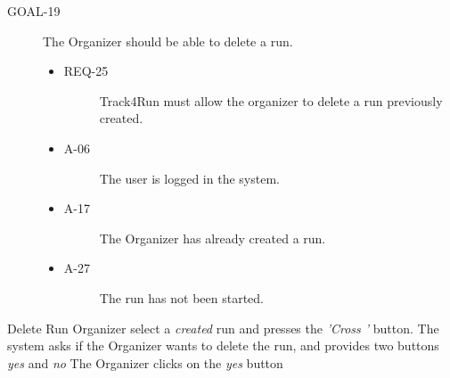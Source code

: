 \documentclass[a4paper]{article}
\newcommand{\requirement}{\ding{229}}%
\begin{document}
        \begin{description}
        	\item[GOAL-19] The Organizer should be able to delete a run.
            	\begin{itemize}
            	    \item[\requirement]
                	\begin{description}
                	\item[REQ-25] Track4Run must allow the organizer to delete a run previously created.
                	\end{description}
                	\item
                	\begin{description}
                	\item[A-06] The user is logged in the system.
                	\end{description}
                	\item
                	\begin{description}
                	\item[A-17] The Organizer has already created a run.
                	\end{description}
                	\item
                	\begin{description}
                	\item[A-27] The run has not been started.
                	\end{description}
                	\end{itemize}
        \end{description}
        
        \begin{usecase}{Delete Run}
              {Organizer select a \textit{created} run and presses the \textit{'Cross '} button.}
              {The system asks if the Organizer wants to delete the run, and provides two buttons \textit{yes} and \textit{no}}
              {The Organizer clicks on the \textit{yes} button}
        \end{usecase}
        
\end{document}
